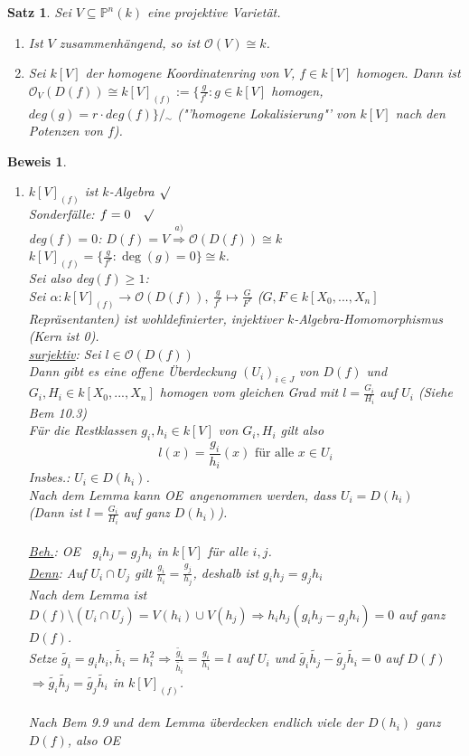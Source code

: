 \documentclass[a4paper,12pt]{report}
\theoremstyle{break}
\newtheorem{Satz}{Satz}
\theoremstyle{nonumberbreak}
\theoremstyle{nonumberplain}
\newtheorem{Bew}{Beweis}
\renewcommand{\OE}{O\!\!E~}
\begin{document}
\begin{Satz}
Sei $V\subseteq \mathbb{P}^n(k)$ eine projektive Varietät.\\
\begin{enumerate}
\item Ist $V$ zusammenhängend, so ist $\mathcal{O}(V)\cong k$.\\
\item Sei $k[V]$ der homogene Koordinatenring von $V$, $f\in k[V]$ homogen. Dann ist
$\mathcal{O}_V(D(f))\cong k[V]_{(f)}:= \{\frac{g}{f^r}: g\in k[V]$ homogen, $deg(g)=r\cdot deg(f)\}/\!\!{}_\sim$
("'homogene Lokalisierung"' von $k[V]$ nach den Potenzen von $f$).
\end{enumerate}
\end{Satz}

\begin{Bew}
\begin{enumerate}
\item[b)] $k[V]_{(f)}$ ist $k$-Algebra $\surd$\\
Sonderfälle: $f=0~~~\surd$\\
deg$(f)=0$: $D(f)=V\stackrel{a)}{\Rightarrow}\mathcal{O}(D(f))\cong k$\\
$k[V]_{(f)}=\{\frac{g}{f^r}: \operatorname{deg}(g)=0\}\cong k$.\\
Sei also deg$(f)\geq 1$:\\
Sei $\alpha: k[V]_{(f)}\rightarrow \mathcal{O}(D(f)),~\frac{g}{f^r}\mapsto\frac{G}{F^r}$ ($G,F\in k[X_0,...,X_n]$ Repräsentanten) ist wohldefinierter, injektiver $k$-Algebra-Homomorphismus (Kern ist 0).\\
\underline{surjektiv}: Sei $l\in\mathcal{O}(D(f))$\\
Dann gibt es eine offene Überdeckung $(U_i)_{i\in J}$ von $D(f)$ und $G_i, H_i\in k[X_0,...,X_n]$ homogen vom gleichen Grad mit $l=\frac{G_i}{H_i}$ auf $U_i$ (Siehe Bem 10.3)\\
Für die Restklassen $g_i, h_i\in k[V]$ von $G_i, H_i$ gilt also
$$l(x)=\frac{g_i}{h_i}(x) \text{ für alle } x\in U_i$$
Insbes.: $U_i\in D(h_i)$.\\
Nach dem Lemma kann \OE angenommen werden, dass $U_i=D(h_i)$\\
(Dann ist $l=\frac{G_i}{H_i}$ auf ganz $D(h_i)$).\\\\
\underline{Beh.}: \OE $~~g_ih_j=g_jh_i$ in $k[V]$ für alle $i,j$.\\
\underline{Denn}: Auf $U_i\cap U_j$ gilt $\frac{g_i}{h_i}=\frac{g_j}{h_j}$, deshalb ist $g_ih_j=g_jh_i$\\
Nach dem Lemma ist $D(f)\setminus (U_i\cap U_j)=V(h_i)\cup V(h_j)\Rightarrow h_ih_j(g_ih_j-g_jh_i)=0$ auf ganz $D(f)$.\\
Setze $\tilde{g_i}=g_ih_i, \tilde{h_i}=h_i^2\Rightarrow \frac{\tilde{g_i}}{\tilde{h_i}}=\frac{g_i}{h_i}=l$ auf $U_i$ und $\tilde{g_i}\tilde{h_j}-\tilde{g_j}\tilde{h_i}=0$ auf $D(f)$\\
$\Rightarrow \tilde{g_i}\tilde{h_j}=\tilde{g_j}\tilde{h_i}$ in $k[V]_{(f)}$.\\
\\
Nach Bem 9.9 und dem Lemma überdecken endlich viele der $D(h_i)$ ganz $D(f)$, also \OE


\end{enumerate}
\end{Bew}
\end{document}
